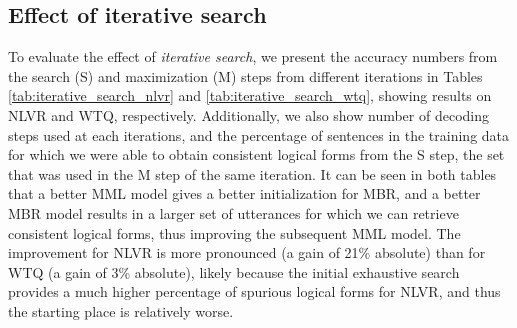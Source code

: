 \begin{table}
    \centering
    \caption{Complexity of logical forms produced at different iterations, from iteration 0 to iteration 3; each logical form could not be produced at the previous iterations}
    \label{tab:logical_form_complexity}
\end{table}
\subsection{Effect of iterative search} \label{sec:results_iterative}
To evaluate the effect of \textit{iterative search}, we present the accuracy numbers from the search (S) and maximization (M) steps from different iterations in Tables \ref{tab:iterative_search_nlvr} and \ref{tab:iterative_search_wtq}, showing results on NLVR and WTQ, respectively. Additionally, we also show number of decoding steps used at each iterations, and the percentage of sentences in the training data for which we were able to obtain consistent logical forms from the S step, the set that was used in the M step of the same iteration. It can be seen in both tables that a better MML model gives a better initialization for MBR, and a better MBR model results in a larger set of utterances for which we can retrieve consistent logical forms, thus improving the subsequent MML model.  The improvement for NLVR is more pronounced (a gain of 21\% absolute) than for WTQ (a gain of 3\% absolute), likely because the initial exhaustive search provides a much higher percentage of spurious logical forms for NLVR, and thus the starting place is relatively worse.

